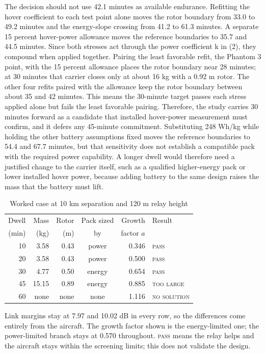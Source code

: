 \documentclass[twocolumn,letterpaper]{IEEEAerospaceCLS}
\newcommand{\gate}[1]{\textsc{#1}}
\begin{document}
The decision should not use 42.1 minutes as available endurance. Refitting the hover coefficient to each test point alone moves the rotor boundary from 33.0 to 49.2 minutes and the energy-slope crossing from 41.2 to 61.3 minutes. A separate 15 percent hover-power allowance moves the reference boundaries to 35.7 and 44.5 minutes. Since both stresses act through the power coefficient k in (2), they compound when applied together. Pairing the least favorable refit, the Phantom 3 point, with the 15 percent allowance places the rotor boundary near 28 minutes; at 30 minutes that carrier closes only at about 16 kg with a 0.92 m rotor. The other four refits paired with the allowance keep the rotor boundary between about 35 and 42 minutes. This means the 30-minute target passes each stress applied alone but fails the least favorable pairing. Therefore, the study carries 30 minutes forward as a candidate that installed hover-power measurement must confirm, and it defers any 45-minute commitment.
Substituting 248 Wh/kg while holding the other battery assumptions fixed moves the reference boundaries to 54.4 and 67.7 minutes, but that sensitivity does not establish a compatible pack with the required power capability. A longer dwell would therefore need a justified change to the carrier itself, such as a qualified higher-energy pack or lower installed hover power, because adding battery to the same design raises the mass that the battery must lift.

\begin{table}[!tb]
\caption{Worked case at 10 km separation and 120 m relay height}
\label{tab:worked}
\centering\small
\setlength{\tabcolsep}{4pt}
\begin{tabular}{@{}r r r c r l@{}}
\toprule
Dwell & Mass & Rotor & Pack sized & Growth & Result \\
(min) & (kg) & (m) & by & factor $a$ & \\
\midrule
10 & 3.58 & 0.43 & power & 0.346 & \gate{pass} \\
20 & 3.58 & 0.43 & power & 0.500 & \gate{pass} \\
30 & 4.77 & 0.50 & energy & 0.654 & \gate{pass} \\
45 & 15.15 & 0.89 & energy & 0.885 & \gate{too large} \\
60 & none & none & none & 1.116 & \gate{no solution} \\
\bottomrule
\end{tabular}

\vspace{2pt}
\begin{minipage}{\columnwidth}\footnotesize
Link margins stay at 7.97 and 10.02 dB in every row, so the differences come entirely from the aircraft. The growth factor shown is the energy-limited one; the power-limited branch stays at 0.570 throughout. \gate{pass} means the relay helps and the aircraft stays within the screening limits; this does not validate the design.
\end{minipage}
\end{table}
\end{document}
